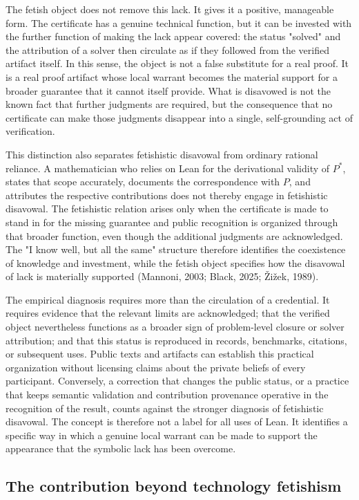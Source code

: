 \documentclass[pdflatex,sn-apa]{sn-jnl}
\begin{document}
The fetish object does not remove this lack. It gives it a positive, manageable form. The certificate has a genuine technical function, but it can be invested with the further function of making the lack appear covered: the status "solved" and the attribution of a solver then circulate as if they followed from the verified artifact itself. In this sense, the object is not a false substitute for a real proof. It is a real proof artifact whose local warrant becomes the material support for a broader guarantee that it cannot itself provide. What is disavowed is not the known fact that further judgments are required, but the consequence that no certificate can make those judgments disappear into a single, self-grounding act of verification.

This distinction also separates fetishistic disavowal from ordinary rational reliance. A mathematician who relies on Lean for the derivational validity of \(P^*\), states that scope accurately, documents the correspondence with \(P\), and attributes the respective contributions does not thereby engage in fetishistic disavowal. The fetishistic relation arises only when the certificate is made to stand in for the missing guarantee and public recognition is organized through that broader function, even though the additional judgments are acknowledged. The "I know well, but all the same" structure therefore identifies the coexistence of knowledge and investment, while the fetish object specifies how the disavowal of lack is materially supported (Mannoni, 2003; Black, 2025; Žižek, 1989).

The empirical diagnosis requires more than the circulation of a credential. It requires evidence that the relevant limits are acknowledged; that the verified object nevertheless functions as a broader sign of problem-level closure or solver attribution; and that this status is reproduced in records, benchmarks, citations, or subsequent uses. Public texts and artifacts can establish this practical organization without licensing claims about the private beliefs of every participant. Conversely, a correction that changes the public status, or a practice that keeps semantic validation and contribution provenance operative in the recognition of the result, counts against the stronger diagnosis of fetishistic disavowal. The concept is therefore not a label for all uses of Lean. It identifies a specific way in which a genuine local warrant can be made to support the appearance that the symbolic lack has been overcome.

\subsection{The contribution beyond technology fetishism}
\end{document}
